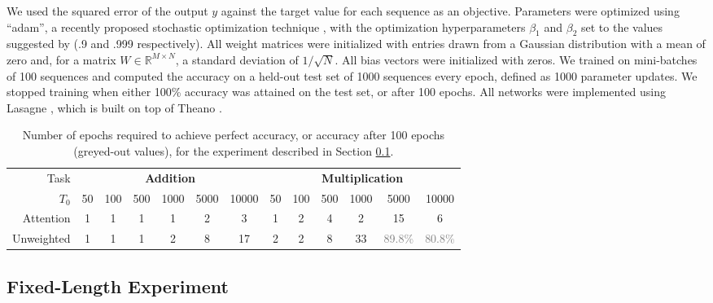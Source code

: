 \documentclass{article} %
\begin{document}
We used the squared error of the output $y$ against the target value for each sequence as an objective.
Parameters were optimized using ``adam'', a recently proposed stochastic optimization technique \citep{kingma2014adam}, with the optimization hyperparameters $\beta_1$ and $\beta_2$ set to the values suggested by \cite{kingma2014adam} (.9 and .999 respectively).
All weight matrices were initialized with entries drawn from a Gaussian distribution with a mean of zero and, for a matrix $W \in \mathbb{R}^{M \times N}$, a standard deviation of $1/\sqrt{N}$.
All bias vectors were initialized with zeros.
We trained on mini-batches of 100 sequences and computed the accuracy on a held-out test set of 1000 sequences every epoch, defined as 1000 parameter updates.
We stopped training when either 100\% accuracy was attained on the test set, or after 100 epochs.
All networks were implemented using Lasagne \citep{dieleman2015lasagne}, which is built on top of Theano \citep{bastien2012theano,bergstra2010theano}.

\begin{table}
  \centering
  \footnotesize
  \begin{tabular}{r c c c c c c c c c c c c}
    \toprule
    Task & \multicolumn{6}{c}{\textbf{Addition}} & \multicolumn{6}{c}{\textbf{Multiplication}} \\
    $T_0$ & 50 & 100 & 500 & 1000 & 5000 & 10000 & 50 & 100 & 500 & 1000 & 5000 & 10000 \\
    \cmidrule(r){2-7}
    \cmidrule(r){8-13}
    Attention & 1 & 1 & 1 & 1 & 2 & 3 & 1 & 2 & 4 & 2 & 15 & 6 \\
    Unweighted & 1 & 1 & 1 & 2 & 8 & 17 & 2 & 2 & 8 & 33 & \textcolor{gray}{89.8\%} & \textcolor{gray}{80.8\%} \\
    \bottomrule
  \end{tabular}
  \caption{Number of epochs required to achieve perfect accuracy, or accuracy after 100 epochs (greyed-out values), for the experiment described in Section \ref{sec:fixed}.}
  \label{tab:fixed}
\end{table}

\subsection{Fixed-Length Experiment}
\label{sec:fixed}
\end{document}

